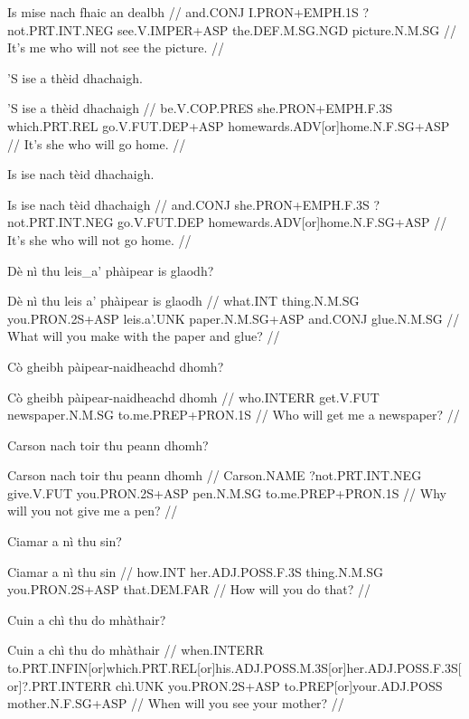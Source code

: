 \documentclass[a4paper,10pt]{article}
\begin{document}
\vspace{4mm}
\gla Is mise nach fhaic an dealbh  //
\glb and.CONJ I.PRON+EMPH.1S ?not.PRT.INT.NEG see.V.IMPER+ASP the.DEF.M.SG.NGD picture.N.M.SG  //
\glft It's me who will not see the picture. //
\endgl
\xe

\ex
\begingl
\glpre 'S ise a thèid dhachaigh. 

\vspace{4mm}
\gla 'S ise a thèid dhachaigh  //
\glb be.V.COP.PRES she.PRON+EMPH.F.3S which.PRT.REL go.V.FUT.DEP+ASP homewards.ADV[or]home.N.F.SG+ASP  //
\glft It's she who will go home. //
\endgl
\xe

\ex
\begingl
\glpre Is ise nach tèid dhachaigh. 

\vspace{4mm}
\gla Is ise nach tèid dhachaigh  //
\glb and.CONJ she.PRON+EMPH.F.3S ?not.PRT.INT.NEG go.V.FUT.DEP homewards.ADV[or]home.N.F.SG+ASP  //
\glft It's she who will not go home. //
\endgl
\xe

\ex
\begingl
\glpre Dè nì thu leis\_a' phàipear is glaodh? 

\vspace{4mm}
\gla Dè nì thu {leis a'} phàipear is glaodh  //
\glb what.INT thing.N.M.SG you.PRON.2S+ASP leis.a'.UNK paper.N.M.SG+ASP and.CONJ glue.N.M.SG  //
\glft What will you make with the paper and glue? //
\endgl
\xe

\ex
\begingl
\glpre Cò gheibh pàipear-naidheachd dhomh? 

\vspace{4mm}
\gla Cò gheibh pàipear-naidheachd dhomh  //
\glb who.INTERR get.V.FUT newspaper.N.M.SG to.me.PREP+PRON.1S  //
\glft Who will get me a newspaper? //
\endgl
\xe

\ex
\begingl
\glpre Carson nach toir thu peann dhomh? 

\vspace{4mm}
\gla Carson nach toir thu peann dhomh  //
\glb Carson.NAME ?not.PRT.INT.NEG give.V.FUT you.PRON.2S+ASP pen.N.M.SG to.me.PREP+PRON.1S  //
\glft Why will you not give me a pen? //
\endgl
\xe

\ex
\begingl
\glpre Ciamar a nì thu sin? 

\vspace{4mm}
\gla Ciamar a nì thu sin  //
\glb how.INT her.ADJ.POSS.F.3S thing.N.M.SG you.PRON.2S+ASP that.DEM.FAR  //
\glft How will you do that? //
\endgl
\xe

\ex
\begingl
\glpre Cuin a chì thu do mhàthair? 

\vspace{4mm}
\gla Cuin a chì thu do mhàthair  //
\glb when.INTERR to.PRT.INFIN[or]which.PRT.REL[or]his.ADJ.POSS.M.3S[or]her.ADJ.POSS.F.3S[or]?.PRT.INTERR chì.UNK you.PRON.2S+ASP to.PREP[or]your.ADJ.POSS mother.N.F.SG+ASP  //
\glft When will you see your mother? //
\endgl
\xe
\end{document}
